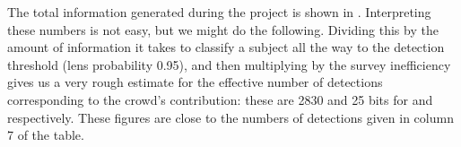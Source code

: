 \documentclass[useAMS,usenatbib,a4paper]{mn2e}
\begin{document}
The total information generated during the \cfhtls project is shown in
. Interpreting these numbers is not easy, but we
might do the following. Dividing this by the amount of information it takes to
classify a \SW subject all the way to the detection threshold (lens
probability 0.95), and then multiplying by the survey inefficiency gives us a
very rough estimate for the effective number of detections corresponding to
the crowd's contribution: these are 2830 and 25 bits for \StageOne and \StageTwo
respectively.  These figures are close to the numbers of detections given in
column 7 of the table.



\label{lastpage}
\bsp
\end{document}
